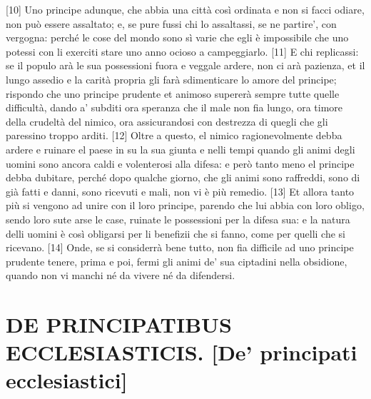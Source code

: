 {[}10{]} Uno principe adunque, che abbia una città così ordinata e non
si facci odiare, non può essere assaltato; e, se pure fussi chi lo
assaltassi, se ne partire', con vergogna: perché le cose del mondo sono
sì varie che egli è impossibile che uno potessi con li exerciti stare
uno anno ocioso a campeggiarlo. {[}11{]} E chi replicassi: se il populo
arà le sua possessioni fuora e veggale ardere, non ci arà pazienza, et
il lungo assedio e la carità propria gli farà sdimenticare lo amore del
principe; rispondo che uno principe prudente et animoso supererà sempre
tutte quelle difficultà, dando a' subditi ora speranza che il male non
fia lungo, ora timore della crudeltà del nimico, ora assicurandosi con
destrezza di quegli che gli paressino troppo arditi. {[}12{]} Oltre a
questo, el nimico ragionevolmente debba ardere e ruinare el paese in su
la sua giunta e nelli tempi quando gli animi degli uomini sono ancora
caldi e volenterosi alla difesa: e però tanto meno el principe debba
dubitare, perché dopo qualche giorno, che gli animi sono raffreddi, sono
di già fatti e danni, sono ricevuti e mali, non vi è più remedio.
{[}13{]} Et allora tanto più si vengono ad unire con il loro principe,
parendo che lui abbia con loro obligo, sendo loro sute arse le case,
ruinate le possessioni per la difesa sua: e la natura delli uomini è
così obligarsi per li benefizii che si fanno, come per quelli che si
ricevano. {[}14{]} Onde, se si considerrà bene tutto, non fia difficile
ad uno principe prudente tenere, prima e poi, fermi gli animi de' sua
ciptadini nella obsidione, quando non vi manchi né da vivere né da
difendersi.

\quebra\section{DE PRINCIPATIBUS ECCLESIASTICIS.
{[}De' principati ecclesiastici{]}}

